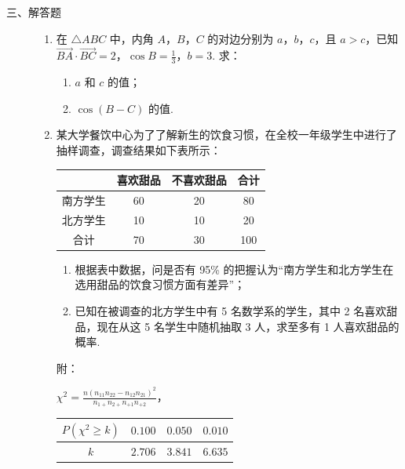 \begin{description}

    \item[三、解答题]

    \begin{enumerate}[leftmargin=5pt]

      \addtocounter{enumi}{+16}

        \item 在 \(\triangle ABC\) 中，内角 \(A\)，\(B\)，\(C\) 的对边分别为 \(a\)，\(b\)，\(c\)，且 \(a > c\)，已知 \(\overrightarrow{BA} \cdot \overrightarrow{BC} = 2\)，\(\cos B = \frac{1}{3}\)，\(b = 3\). 求：
\begin{enumerate}
\item \(a\) 和 \(c\) 的值；
\item \(\cos(B-C)\) 的值.
\end{enumerate}

        \item 某大学餐饮中心为了了解新生的饮食习惯，在全校一年级学生中进行了抽样调查，调查结果如下表所示：

\begin{center}
\begin{tabular}{c|ccc}
 & 喜欢甜品 & 不喜欢甜品 & 合计 \\ \hline
南方学生 & 60 & 20 & 80 \\
北方学生 & 10 & 10 & 20 \\
合计 & 70 & 30 & 100
\end{tabular}
\end{center}

\begin{enumerate}
\item 根据表中数据，问是否有 95\% 的把握认为“南方学生和北方学生在选用甜品的饮食习惯方面有差异”；
\item 已知在被调查的北方学生中有 5 名数学系的学生，其中 2 名喜欢甜品，现在从这 5 名学生中随机抽取 3 人，求至多有 1 人喜欢甜品的概率.
\end{enumerate}

附：
\begin{center}
\(\displaystyle \chi^2 = \frac{n\left(n_{11}n_{22} - n_{12}n_{21}\right)^2}{n_{1+}n_{2+}n_{+1}n_{+2}}\)，
\qquad
\begin{tabular}{c|ccc}
\(P(\chi^2 \geqslant k)\) & \(0.100\) & \(0.050\) & \(0.010\) \\ \hline
\(k\) & \(2.706\) & \(3.841\) & \(6.635\)
\end{tabular}
\end{center}


\end{enumerate}
\end{description}
